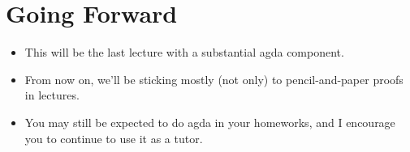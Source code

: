 \documentclass{lecturenotes}
\begin{document}
\section{Going Forward}
\label{sec:going-forward}

\begin{itemize}
\item This will be the last lecture with a substantial agda component.
\item From now on, we'll be sticking mostly (not only) to pencil-and-paper proofs in lectures.
\item You may still be expected to do agda in your homeworks, and I encourage you to continue to use it as a tutor.
\end{itemize}
\end{document}
